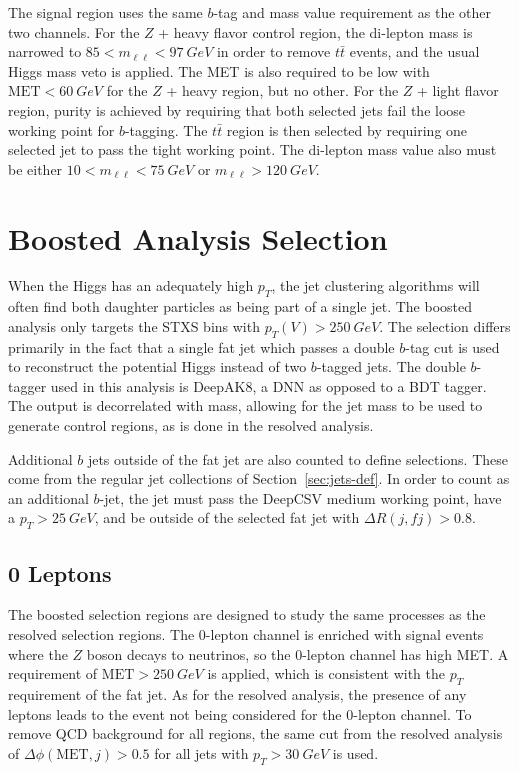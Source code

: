 The signal region uses the same $b$-tag and mass value requirement as the other two channels.
For the $Z$ + heavy flavor control region,
the di-lepton mass is narrowed to $85 < m_{\ell\ell} < \SI{97}{GeV}$
in order to remove $t\bar{t}$ events, and the usual Higgs mass veto is applied.
The MET is also required to be low with $\mathrm{MET} < \SI{60}{GeV}$
for the $Z$ + heavy region, but no other.
For the $Z$ + light flavor region, purity is achieved by requiring
that both selected jets fail the loose working point for $b$-tagging.
The $t\bar{t}$ region is then selected by requiring
one selected jet to pass the tight working point.
The di-lepton mass value also must be either $10 < m_{\ell\ell} < \SI{75}{GeV}$
or $m_{\ell\ell} > \SI{120}{GeV}$.

\section{Boosted Analysis Selection}

When the Higgs has an adequately high $p_T$,
the jet clustering algorithms will often find both daughter particles
as being part of a single jet.
The boosted analysis only targets the STXS bins with $p_T(V) > \SI{250}{GeV}$.
The selection differs primarily in the fact that a single fat jet
which passes a double $b$-tag cut \cite{Sirunyan_2018}
is used to reconstruct the potential Higgs instead of two $b$-tagged jets.
The double $b$-tagger used in this analysis is DeepAK8,
a DNN as opposed to a BDT tagger.
The output is decorrelated with mass, allowing for the jet mass to be used
to generate control regions, as is done in the resolved analysis.

Additional $b$ jets outside of the fat jet are also counted to define selections.
These come from the regular jet collections of Section~\ref{sec:jets-def}.
In order to count as an additional $b$-jet,
the jet must pass the DeepCSV medium working point,
have a $p_T > \SI{25}{GeV}$, and be outside of the selected fat jet
with $\Delta R(j, f\!j) > 0.8$.

\subsection{0 Leptons}

The boosted selection regions are designed to study the same processes
as the resolved selection regions.
The 0-lepton channel is enriched with signal events where
the $Z$ boson decays to neutrinos, so the 0-lepton channel has high MET.
A requirement of $\mathrm{MET} > \SI{250}{GeV}$ is applied,
which is consistent with the $p_T$ requirement of the fat jet.
As for the resolved analysis, the presence of any leptons leads to
the event not being considered for the 0-lepton channel.
To remove QCD background for all regions, the same cut from the resolved analysis of
$\Delta \phi(\mathrm{MET}, j) > 0.5$ for all jets with $p_T > \SI{30}{GeV}$ is used.

